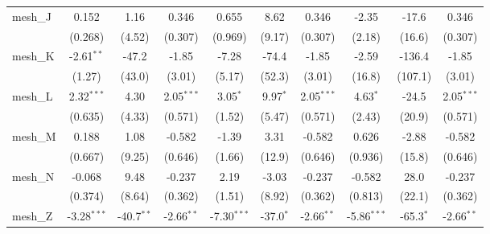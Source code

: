 \begin{tabular}{lccccccccc}
   mesh\_J                                                     & 0.152          & 1.16           & 0.346          & 0.655          & 8.62          & 0.346          & -2.35          & -17.6          & 0.346\\   
                                                               & (0.268)        & (4.52)         & (0.307)        & (0.969)        & (9.17)        & (0.307)        & (2.18)         & (16.6)         & (0.307)\\   
   mesh\_K                                                     & -2.61$^{**}$   & -47.2          & -1.85          & -7.28          & -74.4         & -1.85          & -2.59          & -136.4         & -1.85\\   
                                                               & (1.27)         & (43.0)         & (3.01)         & (5.17)         & (52.3)        & (3.01)         & (16.8)         & (107.1)        & (3.01)\\   
   mesh\_L                                                     & 2.32$^{***}$   & 4.30           & 2.05$^{***}$   & 3.05$^{*}$     & 9.97$^{*}$    & 2.05$^{***}$   & 4.63$^{*}$     & -24.5          & 2.05$^{***}$\\   
                                                               & (0.635)        & (4.33)         & (0.571)        & (1.52)         & (5.47)        & (0.571)        & (2.43)         & (20.9)         & (0.571)\\   
   mesh\_M                                                     & 0.188          & 1.08           & -0.582         & -1.39          & 3.31          & -0.582         & 0.626          & -2.88          & -0.582\\   
                                                               & (0.667)        & (9.25)         & (0.646)        & (1.66)         & (12.9)        & (0.646)        & (0.936)        & (15.8)         & (0.646)\\   
   mesh\_N                                                     & -0.068         & 9.48           & -0.237         & 2.19           & -3.03         & -0.237         & -0.582         & 28.0           & -0.237\\   
                                                               & (0.374)        & (8.64)         & (0.362)        & (1.51)         & (8.92)        & (0.362)        & (0.813)        & (22.1)         & (0.362)\\   
   mesh\_Z                                                     & -3.28$^{***}$  & -40.7$^{**}$   & -2.66$^{**}$   & -7.30$^{***}$  & -37.0$^{*}$   & -2.66$^{**}$   & -5.86$^{***}$  & -65.3$^{*}$    & -2.66$^{**}$\\   

\end{tabular}
